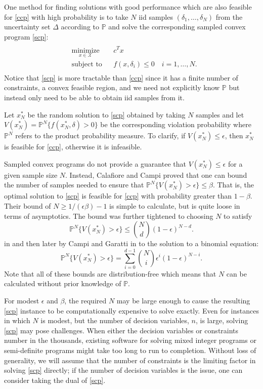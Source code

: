 \documentclass[12pt]{article}
\begin{document}
One method for finding solutions with good performance which are also feasible for \ref{ccp} with high probability is to take $N$ iid samples $(\delta_1, \ldots, \delta_N)$ from the uncertainty set $\Delta$ according to $\mathbb{P}$ and solve the corresponding sampled convex program \ref{scp}:
\begin{align}\label{scp}
\begin{split}
\begin{aligned}
    & \underset{x \in \mathcal{X}}{\text{minimize}}
    & & c^T x \\
    & \text{subject to}
    & & f(x,\delta_i) \leq 0 \quad i = 1, \ldots, N.
\end{aligned}
\end{split} \tag{SCP$_N$}
\end{align}
Notice that \ref{scp} is more tractable than \ref{ccp} since it has a finite number of constraints, a convex feasible region, and we need not explicitly know $\mathbb{P}$ but instead only need to be able to obtain iid samples from it.

Let $x_N^*$ be the random solution to \ref{scp} obtained by taking $N$ samples and let $V(x_N^*) = \mathbb{P}^N\{f(x_N^*, \delta) > 0\}$ be the corresponding violation probability where $\mathbb{P}^N$ refers to the product probability measure.
To clarify, if $V(x_N^*) \leq \epsilon$, then $x_N^*$ is feasible for \ref{ccp}, otherwise it is infeasible.

Sampled convex programs do not provide a guarantee that $V(x_N^*) \leq \epsilon$ for a given sample size $N$.
Instead, Calafiore and Campi \cite{campi05} proved that one can bound the number of samples needed to ensure that $\mathbb{P}^N\{V(x_N^*) > \epsilon\} \leq \beta$.
That is, the optimal solution to \ref{scp} is feasible for \ref{ccp} with probability greater than $1 - \beta$.
Their bound of $N \geq 1/(\epsilon\beta) - 1$ is simple to calculate, but is quite loose in terms of asymptotics.
The bound was further tightened to choosing $N$ to satisfy
\[ \mathbb{P}^N\{V(x_N^*) > \epsilon\} \leq \binom{N}{d}(1-\epsilon)^{N-d}. \]
in \cite{campi06} and then later by Campi and Garatti in \cite{campi08} to the solution to a binomial equation:
\[ \mathbb{P}^N\{V(x_N^*) > \epsilon\} = \sum_{i=0}^{d-1} \binom{N}{i} \epsilon^i (1-\epsilon)^{N-i}. \]
Note that all of these bounds are distribution-free which means that $N$ can be calculated without prior knowledge of $\mathbb{P}$.

For modest $\epsilon$ and $\beta$, the required $N$ may be large enough to cause the resulting \ref{scp} instance to be computationally expensive to solve exactly.
Even for instances in which $N$ is modest, but the number of decision variables, $n$, is large, solving \ref{scp} may pose challenges.
When either the decision variables or constraints number in the thousands, existing software for solving mixed integer programs or semi-definite programs might take too long to run to completion.
Without loss of generality, we will assume that the number of constraints is the limiting factor in solving \ref{scp} directly; if the number of decision variables is the issue, one can consider taking the dual of \ref{scp}.
\end{document}
